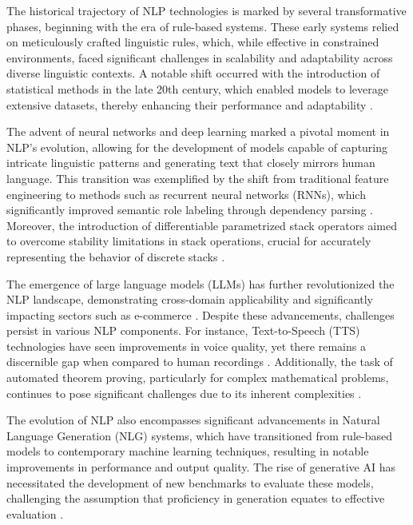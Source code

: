 The historical trajectory of NLP technologies is marked by several transformative phases, beginning with the era of rule-based systems. These early systems relied on meticulously crafted linguistic rules, which, while effective in constrained environments, faced significant challenges in scalability and adaptability across diverse linguistic contexts. A notable shift occurred with the introduction of statistical methods in the late 20th century, which enabled models to leverage extensive datasets, thereby enhancing their performance and adaptability \cite{yamshchikov2020styletransferparaphraselookingsensible}.



The advent of neural networks and deep learning marked a pivotal moment in NLP's evolution, allowing for the development of models capable of capturing intricate linguistic patterns and generating text that closely mirrors human language. This transition was exemplified by the shift from traditional feature engineering to methods such as recurrent neural networks (RNNs), which significantly improved semantic role labeling through dependency parsing \cite{stogin2022provablystableneuralnetwork}. Moreover, the introduction of differentiable parametrized stack operators aimed to overcome stability limitations in stack operations, crucial for accurately representing the behavior of discrete stacks \cite{stogin2022provablystableneuralnetwork}.



The emergence of large language models (LLMs) has further revolutionized the NLP landscape, demonstrating cross-domain applicability and significantly impacting sectors such as e-commerce \cite{pandy2024advancementsroboticsprocessautomation}. Despite these advancements, challenges persist in various NLP components. For instance, Text-to-Speech (TTS) technologies have seen improvements in voice quality, yet there remains a discernible gap when compared to human recordings \cite{yamshchikov2020styletransferparaphraselookingsensible}. Additionally, the task of automated theorem proving, particularly for complex mathematical problems, continues to pose significant challenges due to its inherent complexities \cite{ling2021bayesiannetworkstructurelearning}.



The evolution of NLP also encompasses significant advancements in Natural Language Generation (NLG) systems, which have transitioned from rule-based models to contemporary machine learning techniques, resulting in notable improvements in performance and output quality. The rise of generative AI has necessitated the development of new benchmarks to evaluate these models, challenging the assumption that proficiency in generation equates to effective evaluation \cite{yamshchikov2020styletransferparaphraselookingsensible}.



